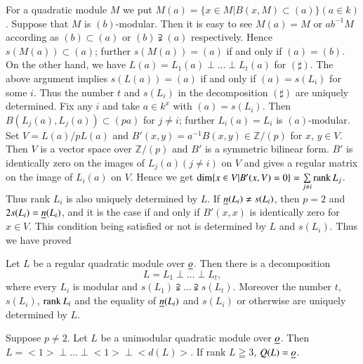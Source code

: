 For a quadratic module $M$ we put $M(a)=\{x\in M|B(x,M)\subset
(a)\}(a\in k)$. Suppose that $M$ is $(b)$-modular. Then it is easy to
see $M(a)=M$ or $ab^{-1}M$ according as $(b)\subset (a)$ or
$(b)\supsetneqq (a)$ respectively. Hence
$s(M(a))\subset (a)$; further $s(M(a))=(a)$ if and only if
$(a)=(b)$. On the other hand, we have $L(a)=L_{1}(a)\perp\ldots\perp
L_{t}(a)$ for $(\sharp)$. The above argument implies $s(L(a))=(a)$ if
and only if $(a)=s(L_{i})$ for some $i$. Thus the number $t$ and
$s(L_{i})$ in the decomposition $(\sharp)$ are uniquely
determined. Fix any $i$ and take $a\in k^{x}$ with
$(a)=s(L_{i})$. Then $B(L_{j}(a), L_{j}(a))\subset (pa)$ for $j\neq
i$; further $L_{i}(a)=L_{i}$ is $(a)$-modular. Set 
$V=L(a)/pL(a)$ and $B'(x,y)=a^{-1}B(x,y)\in\mathbb{Z}/(p)$ for $x$,
$y\in V$. Then $V$ is a vector space over $\mathbb{Z}/(p)$ and $B'$ is
a symmetric bilinear form. $B'$ is identically zero on the images of
$L_{j}(a)(j\neq i)$ on $V$ and gives a regular matrix on\pageoriginale
the image of $L_{i}(a)$ on $V$. Hence we get $\dim\{x\in
V|B'(x,V)=0\}=\sum\limits_{j\neq i}\operatorname{rank} L_{j}$. Thus rank $L_{i}$ is
also uniquely determined by $L$. If $\underline{n}(L_{i})\neq s(L_{i})$, then
$p=2$ and $2s(L_{i})=\underline{n}(L_{i})$, and it is the case if and only if
$B'(x,x)$ is identically zero for $x\in V$. This condition being
satisfied or not is determined by $L$ and $s(L_{i})$. Thus we have
proved

\begin{prop}\label{c2:prop-2.11}
Let $L$ be a regular quadratic module over $\underline{o}$. Then there is a
decomposition
$$
L=L_{1}\perp\ldots\perp L_{t},
$$
where every $L_{i}$ is modular and
$s(L_{1})\supsetneqq \ldots \supsetneqq 
s(L_{t})$. Moreover the number $t$, $s(L_{i})$, $\operatorname{rank} L_{i}$ and the
equality of $\underline{n}(L_{i})$ and $s(L_{i})$ or otherwise are uniquely
determined by $L$.
\end{prop}

\begin{prop}\label{c2:prop-2.12}
Suppose $p\neq 2$. Let $L$ be a unimodular quadratic module over
$\underline{o}$. Then $L=<1>\perp\ldots\perp<1>\perp <d(L)>$. If rank $L\geqq
3$, $Q(L)=\underline{o}$.
\end{prop}

